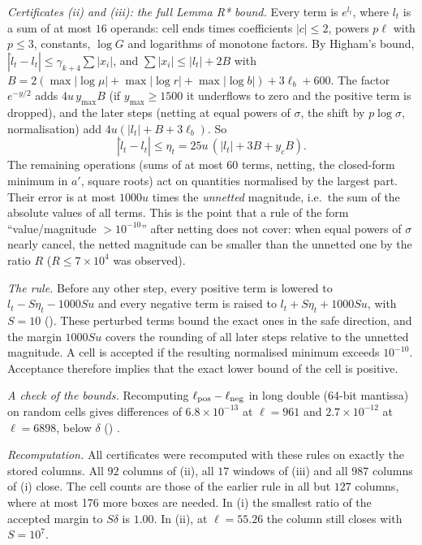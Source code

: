 \emph{Certificates (ii) and (iii): the full Lemma R* bound.}
Every term is $e^{l_t}$, where $l_t$ is a sum of at most $16$ operands: cell ends times coefficients $|c|\le2$, powers $p\ell$ with $p\le3$, constants, $\log G$ and logarithms of monotone factors.
By Higham's bound, $|\hat l_t-l_t|\le\gamma_{k+4}\sum|x_i|$, and $\sum|x_i|\le|l_t|+2B$ with $B=2(\max|\log\mu|+\max|\log r|+\max|\log b|)+3\ell_b+600$.
The factor $e^{-y/2}$ adds $4u\,y_{\max}B$ (if $y_{\max}\ge1500$ it underflows to zero and the positive term is dropped), and the later steps (netting at equal powers of $\sigma$, the shift by $p\log\sigma$, normalisation) add $4u(|l_t|+B+3\ell_b)$.
So
\begin{equation}
|\hat l_t-l_t|\le\eta_t=25u\,(|l_t|+3B+y_cB).
\end{equation}
The remaining operations (sums of at most $60$ terms, netting, the closed-form minimum in $a'$, square roots) act on quantities normalised by the largest part.
Their error is at most $1000u$ times the \emph{unnetted} magnitude, i.e.\ the sum of the absolute values of all terms.
This is the point that a rule of the form ``value/magnitude $>10^{-10}$'' after netting does not cover: when equal powers of $\sigma$ nearly cancel, the netted magnitude can be smaller than the unnetted one by the ratio $R$ ($R\le7\times10^4$ was observed).

\emph{The rule.}
Before any other step, every positive term is lowered to $l_t-S\eta_t-1000Su$ and every negative term is raised to $l_t+S\eta_t+1000Su$, with $S=10$ ().
These perturbed terms bound the exact ones in the safe direction, and the margin $1000Su$ covers the rounding of all later steps relative to the unnetted magnitude.
A cell is accepted if the resulting normalised minimum exceeds $10^{-10}$.
Acceptance therefore implies that the exact lower bound of the cell is positive.

\emph{A check of the bounds.}
Recomputing $\ell_{\rm pos}-\ell_{\rm neg}$ in long double (64-bit mantissa) on random cells gives differences of $6.8\times10^{-13}$ at $\ell=961$ and $2.7\times10^{-12}$ at $\ell=6898$, below $\delta$ () \numst.

\emph{Recomputation.}
All certificates were recomputed with these rules on exactly the stored columns.
All $92$ columns of (ii), all $17$ windows of (iii) and all $987$ columns of (i) close.
The cell counts are those of the earlier rule in all but $127$ columns, where at most 176 more boxes are needed.
In (i) the smallest ratio of the accepted margin to $S\delta$ is $1.00$.
In (ii), at $\ell=55.26$ the column still closes with $S=10^{7}$.

